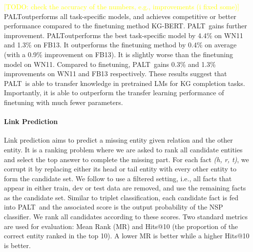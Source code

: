 \documentclass[11pt]{article}
\newcommand{\method}{\textsc{PALT}}
\newcommand{\methodLarge}{\method}
\newcommand{\texthrt}[1]{\textsl{#1}}
\newcommand{\todo}[1]{\textcolor{yellow}{[TODO: #1]}}
\newcommand{\todo}[1]{}
\begin{document}
 
\todo{check the accuracy of the numbers, e.g., improvements (i fixed some)}
\method outperforms all task-specific models, and achieves competitive or better performance compared to the finetuning method KG-BERT. \methodLarge\ gains further improvement. \method outperforms the best task-specific model by 4.4\% on WN11 and 1.3\% on FB13. It outperforms the finetuning method by 0.4\% on average (with a 0.9\% improvement on FB13). It is slightly worse than the finetuning model on WN11. Compared to finetuning, \methodLarge\ gains 0.3\% and 1.3\% improvements on WN11 and FB13 respectively. These results suggest that \method\ is able to transfer knowledge in pretrained LMs for KG completion tasks. Importantly, it is able to outperform the transfer learning performance of finetuning with much fewer parameters.


\paragraph{Link Prediction}
Link prediction aims to predict a missing entity given relation and the other entity. It is a ranking problem where we are asked to rank all candidate entities and select the top answer to complete the missing part. For each fact \texthrt{(h, r, t)}, we corrupt it by replacing either its head or tail entity with every other entity to form the candidate set. We follow \citet{TransE} to use a filtered setting, i.e., all facts that appear in either train, dev or test data are removed, and use the remaining facts as the candidate set. Similar to triplet classification, each candidate fact is fed into \method\ and the associated score is the output probability of the NSP classifier. We rank all candidates according to these scores. Two standard metrics are used for evaluation: Mean Rank (MR) and Hits@10 (the proportion of the correct entity ranked in the top 10). A lower MR is better while a higher Hits@10 is better. 
\end{document}
